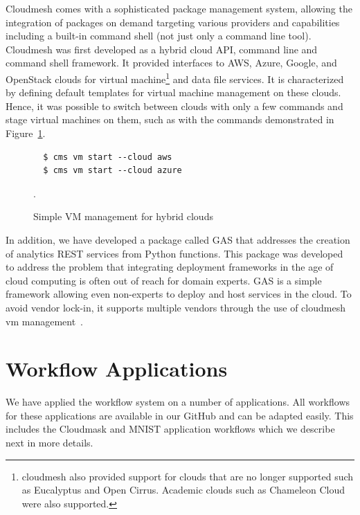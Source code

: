 \documentclass[sigplan,screen]{acmart}
\newcommand{\FILE}[1]{}
\begin{document}
Cloudmesh comes with a sophisticated package management system,
allowing the integration of packages on demand targeting various providers
and capabilities including a built-in command shell (not just only
a command line tool). Cloudmesh was first developed as a hybrid cloud
API, command line and command shell framework. It provided interfaces
to AWS, Azure, Google, and OpenStack clouds for virtual
machine\footnote{cloudmesh also provided support for clouds that are no
longer supported such as Eucalyptus and Open Cirrus. Academic clouds
such as Chameleon Cloud were also supported.} and data file services. It
is characterized by defining default templates for virtual machine
management on these clouds. Hence, it was possible to switch between clouds
with only a few commands and stage virtual machines on them, such
as with the commands demonstrated in Figure~\ref{fig:cms}.

\begin{figure}[htb]

{\scriptsize\begin{verbatim}
  $ cms vm start --cloud aws
  $ cms vm start --cloud azure
\end{verbatim}}

\caption{Simple VM management for hybrid clouds}
\label{fig:cms}.
\end{figure}  

In addition, we have developed a package called GAS that addresses
the creation of analytics REST services from Python functions. This
package was developed to address the problem that integrating
deployment frameworks in the age of cloud computing is often out of
reach for domain experts. GAS is a simple framework allowing even
non-experts to deploy and host services in the cloud. To avoid vendor
lock-in, it supports multiple vendors through the use of cloudmesh vm
management~\cite{las21-gas}.


% 
\FILE{applications.tex}

\section{Workflow Applications}

We have applied the workflow system on a number of applications. All
workflows for these applications are available in our GitHub and can
be adapted easily. This includes the Cloudmask and MNIST application
workflows which we describe next in more details.
\end{document}
